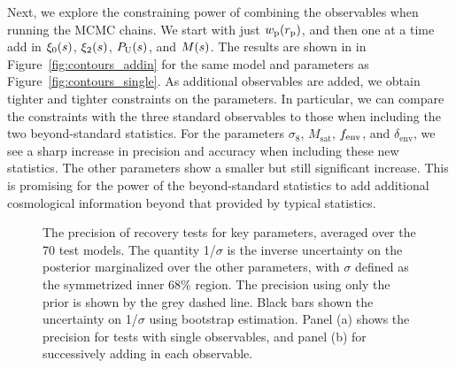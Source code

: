 Next, we explore the constraining power of combining the observables when running the MCMC chains.
We start with just $w_\mathrm{p}(r_\mathrm{p})$, and then one at a time add in $\xi_0(s)$, $\xi_2(s)$, $P_\mathrm{U}(s)$, and $M(s)$.
The results are shown in in Figure~\ref{fig:contours_addin} for the same model and parameters as Figure~\ref{fig:contours_single}.
As additional observables are added, we obtain tighter and tighter constraints on the parameters.
In particular, we can compare the constraints with the three standard observables to those when including the two beyond-standard statistics.
For the parameters $\sigma_8$, $M_\mathrm{sat}$, $f_\mathrm{env}$, and $\delta_\mathrm{env}$, we see a sharp increase in precision and accuracy when including these new statistics. 
The other parameters show a smaller but still significant increase.
This is promising for the power of the beyond-standard statistics to add additional cosmological information beyond that provided by typical statistics.

\begin{figure}%
\centering
{}
\hspace{0.04\textwidth}
\caption{The precision of recovery tests for key parameters, averaged over the 70 test models. The quantity 1/$\sigma$ is the inverse uncertainty on the posterior marginalized over the other parameters, with $\sigma$ defined as the symmetrized inner 68\% region. The precision using only the prior is shown by the grey dashed line. Black bars shown the uncertainty on  1/$\sigma$ using bootstrap estimation. Panel (a) shows the precision for tests with single observables, and panel (b) for successively adding in each observable.}
\label{fig:recovery}
\end{figure}

